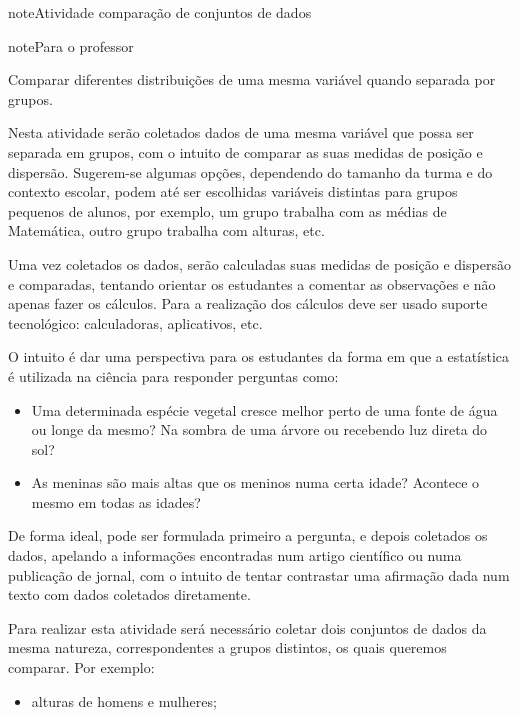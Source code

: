 \practice{ }
\label{\detokenize{PE104-5:sec-praticando2}}\label{\detokenize{PE104-5::doc}}\label{\detokenize{PE104-5:praticando}}\label{\detokenize{PE104-5:ativ-compara-categorias}}
\begin{sphinxadmonition}{note}{Atividade}{ comparação de conjuntos de dados}

\begin{sphinxadmonition}{note}{Para o professor}

 Comparar diferentes distribuições de uma mesma variável quando separada por grupos.

  Nesta atividade serão coletados dados de uma mesma variável que possa ser separada em grupos, com o intuito de comparar as suas medidas de posição e dispersão. Sugerem-se algumas opções, dependendo do tamanho da turma e do contexto escolar, podem até ser escolhidas variáveis distintas para grupos pequenos de alunos, por exemplo, um grupo trabalha com as médias de Matemática, outro grupo trabalha com alturas, etc.

Uma vez coletados os dados, serão calculadas suas medidas de posição e dispersão e comparadas, tentando orientar os estudantes a comentar as observações e não apenas fazer os cálculos. Para a realização dos cálculos deve ser usado suporte tecnológico: calculadoras, aplicativos, etc.

O intuito é dar uma perspectiva para os estudantes da forma em que a estatística é utilizada na ciência para responder perguntas como:
\begin{itemize}
\item {} 
Uma determinada espécie vegetal cresce melhor perto de uma fonte de água ou longe da mesmo? Na sombra de uma árvore ou recebendo luz direta do sol?

\item {} 
As meninas são mais altas que os meninos numa certa idade? Acontece o mesmo em todas as idades?

\end{itemize}

De forma ideal, pode ser formulada primeiro a pergunta, e depois coletados os dados, apelando a informações encontradas num artigo científico ou numa publicação de jornal, com o intuito de tentar contrastar uma afirmação dada num texto com dados coletados diretamente.
\end{sphinxadmonition}

Para realizar esta atividade será necessário coletar dois conjuntos de dados da mesma natureza, correspondentes a grupos distintos, os quais queremos comparar. Por exemplo:
\begin{itemize}
\item {} 
alturas de homens e mulheres;


\end{itemize}
\end{sphinxadmonition}
